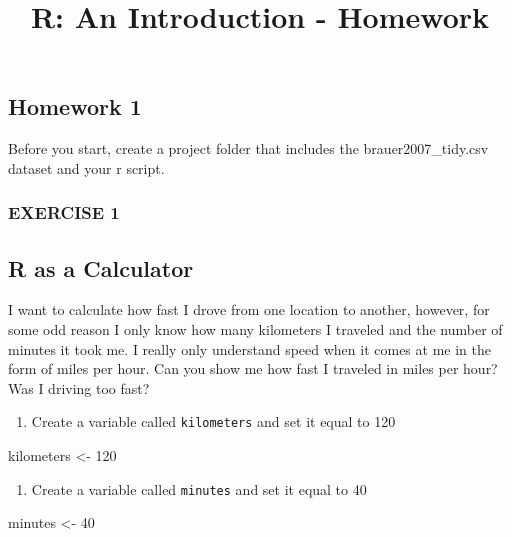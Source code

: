 \documentclass[]{article}
\title{R: An Introduction - Homework}
\author{}
\date{}
\newenvironment{Shaded}{\begin{snugshade}}{\end{snugshade}}
\newcommand{\DecValTok}[1]{\textcolor[rgb]{0.00,0.00,0.81}{#1}}
\newcommand{\StringTok}[1]{\textcolor[rgb]{0.31,0.60,0.02}{#1}}
\newcommand{\NormalTok}[1]{#1}
\providecommand{\tightlist}{%
  \setlength{\itemsep}{0pt}\setlength{\parskip}{0pt}}
\begin{document}
\maketitle

\subsection{Homework 1}\label{homework-1}

Before you start, create a project folder that includes the
brauer2007\_tidy.csv dataset and your r script.

\subsubsection{EXERCISE 1}\label{exercise-1}

\subsection{R as a Calculator}\label{r-as-a-calculator}

I want to calculate how fast I drove from one location to another,
however, for some odd reason I only know how many kilometers I traveled
and the number of minutes it took me. I really only understand speed
when it comes at me in the form of miles per hour. Can you show me how
fast I traveled in miles per hour? Was I driving too fast?

\begin{enumerate}
\def\labelenumi{\arabic{enumi}.}
\tightlist
\item
  Create a variable called \texttt{kilometers} and set it equal to 120
\end{enumerate}

\begin{Shaded}
\begin{Highlighting}[]
\NormalTok{kilometers <-}\StringTok{ }\DecValTok{120}
\end{Highlighting}
\end{Shaded}

\begin{enumerate}
\def\labelenumi{\arabic{enumi}.}
\setcounter{enumi}{1}
\tightlist
\item
  Create a variable called \texttt{minutes} and set it equal to 40
\end{enumerate}

\begin{Shaded}
\begin{Highlighting}[]
\NormalTok{minutes <-}\StringTok{ }\DecValTok{40}
\end{Highlighting}
\end{Shaded}
\end{document}
